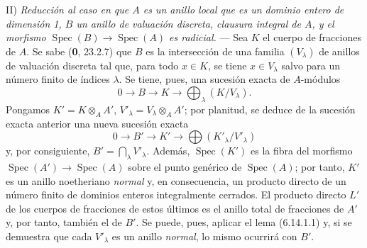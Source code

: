 II) \emph{Reducción al caso en que $A$ es un anillo local que es un dominio
entero de dimensión 1, $B$ un anillo de valuación discreta, clausura
integral de $A$, y el morfismo
$\operatorname{Spec}(B)\to\operatorname{Spec}(A)$ es radicial.} ---
Sea $K$ el cuerpo de fracciones de $A$. Se sabe (\textbf 0, 23.2.7) que $B$
es la intersección de una familia $(V_\lambda)$ de anillos de
valuación discreta tal que, para todo $x\in K$, se tiene
$x\in V_\lambda$ salvo para un número finito de índices $\lambda$.
Se tiene, pues, una sucesión exacta de $A$-módulos
\[
0\longrightarrow B\longrightarrow K\longrightarrow
\bigoplus_\lambda(K/V_\lambda).
\]
Pongamos $K'=K\otimes_A A'$, $V'_\lambda=V_\lambda\otimes_A A'$;
por planitud, se deduce de la sucesión exacta anterior una nueva
sucesión exacta
\[
0\longrightarrow B'\longrightarrow K'\longrightarrow
\bigoplus(K'_\lambda/V'_\lambda)
\]
y, por consiguiente, $B'=\bigcap_\lambda V'_\lambda$. Además,
$\operatorname{Spec}(K')$ es la fibra del morfismo
$\operatorname{Spec}(A')\to\operatorname{Spec}(A)$ sobre el punto
genérico de $\operatorname{Spec}(A)$; por tanto, $K'$ es un anillo
noetheriano \emph{normal} y, en consecuencia, un producto directo de un
número finito de dominios enteros integralmente cerrados. El producto
directo $L'$ de los cuerpos de fracciones de estos últimos es el
anillo total de fracciones de $A'$ y, por tanto, también el de $B'$.
Se puede, pues, aplicar el lema (6.14.1.1) y, si se demuestra que cada
$V'_\lambda$ es un anillo \emph{normal}, lo mismo ocurrirá con $B'$.
